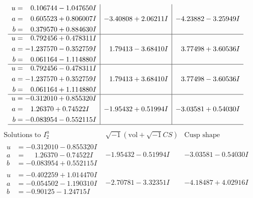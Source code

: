\documentclass[1p]{elsarticle_modified}
\theoremstyle{definition}
\newcommand{\I}{\sqrt{-1}}
\begin{document}
$$\begin{array}{c|c|c}
\begin{aligned}
u &= \phantom{-}0.106744 - 1.047650 I \\
a &= \phantom{-}0.605523 + 0.806007 I \\
b &= \phantom{-}0.379570 + 0.884630 I\end{aligned}
 & -3.40808 + 2.06211 I & -4.23882 - 3.25949 I \\ \hline\begin{aligned}
u &= \phantom{-}0.792456 + 0.478311 I \\
a &= -1.237570 - 0.352759 I \\
b &= \phantom{-}0.061164 - 1.114880 I\end{aligned}
 & \phantom{-}1.79413 - 3.68410 I & \phantom{-}3.77498 + 3.60536 I \\ \hline\begin{aligned}
u &= \phantom{-}0.792456 - 0.478311 I \\
a &= -1.237570 + 0.352759 I \\
b &= \phantom{-}0.061164 + 1.114880 I\end{aligned}
 & \phantom{-}1.79413 + 3.68410 I & \phantom{-}3.77498 - 3.60536 I \\ \hline\begin{aligned}
u &= -0.312010 + 0.855320 I \\
a &= \phantom{-}1.26370 + 0.74522 I \\
b &= -0.083954 - 0.552115 I\end{aligned}
 & -1.95432 + 0.51994 I & -3.03581 + 0.54030 I\\
 \hline 
 \end{array}$$\newpage$$\begin{array}{c|c|c}  
\text{Solutions to }I^u_{2}& \I (\text{vol} + \sqrt{-1}CS) & \text{Cusp shape}\\
 \hline 
\begin{aligned}
u &= -0.312010 - 0.855320 I \\
a &= \phantom{-}1.26370 - 0.74522 I \\
b &= -0.083954 + 0.552115 I\end{aligned}
 & -1.95432 - 0.51994 I & -3.03581 - 0.54030 I \\ \hline\begin{aligned}
u &= -0.402259 + 1.014470 I \\
a &= -0.054502 - 1.190310 I \\
b &= -0.90125 - 1.24715 I\end{aligned}
 & -2.70781 - 3.32351 I & -4.18487 + 4.02916 I \\ \hline\begin{aligned}

\end{aligned}
\end{array}$$
\end{document}
